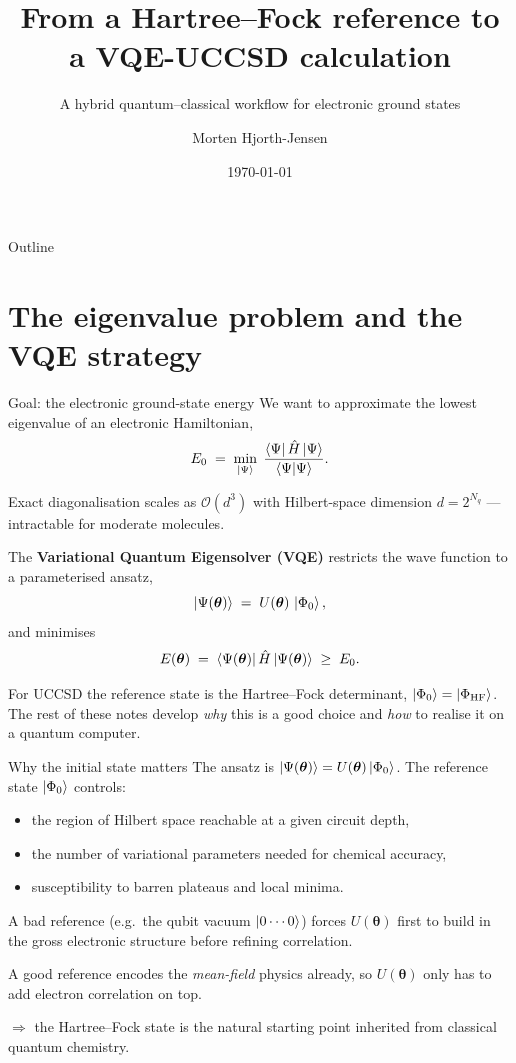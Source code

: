 \documentclass[10pt,aspectratio=169]{beamer}
\title[VQE-UCCSD from a Hartree--Fock reference]
{From a Hartree--Fock reference to a VQE-UCCSD calculation}
\subtitle{A hybrid quantum--classical workflow for electronic ground states}
\author{Morten Hjorth-Jensen}
\date{\today}
\begin{document}
\begin{frame}
\titlepage
\end{frame}

\begin{frame}{Outline}
\tableofcontents
\end{frame}

\section{The eigenvalue problem and the VQE strategy}

\begin{frame}{Goal: the electronic ground-state energy}
We want to approximate the lowest eigenvalue of an electronic Hamiltonian,
\[
E_0 \;=\; \min_{\ket{\Psi}}\;
\frac{\bra{\Psi}\hat H\ket{\Psi}}{\braket{\Psi|\Psi}}.
\]

Exact diagonalisation scales as $\mathcal{O}(d^3)$ with Hilbert-space dimension $d=2^{N_q}$ --- intractable for moderate molecules.

\medskip
The \textbf{Variational Quantum Eigensolver (VQE)} restricts the wave function to a parameterised ansatz,
\[
\ket{\Psi(\bm\theta)} \;=\; U(\bm\theta)\,\ket{\Phi_0},
\]
and minimises
\[
E(\bm\theta) \;=\; \bra{\Psi(\bm\theta)}\hat H\ket{\Psi(\bm\theta)} \;\geq\; E_0.
\]

For UCCSD the reference state is the Hartree--Fock determinant,
$\ket{\Phi_0}=\ket{\Phi_{\mathrm{HF}}}$. The rest of these notes
develop \emph{why} this is a good choice and \emph{how} to realise it on a quantum computer.
\end{frame}

\begin{frame}{Why the initial state matters}
The ansatz is $\ket{\Psi(\bm\theta)} = U(\bm\theta)\ket{\Phi_0}$. The reference state $\ket{\Phi_0}$ controls:
\begin{itemize}
  \item the region of Hilbert space reachable at a given circuit depth,
  \item the number of variational parameters needed for chemical accuracy,
  \item susceptibility to barren plateaus and local minima.
\end{itemize}

\medskip
A bad reference (e.g.\ the qubit vacuum $\ket{0\cdots 0}$) forces $U(\bm\theta)$ first to build in the gross electronic structure before refining correlation.

\medskip
A good reference encodes the \emph{mean-field} physics already, so $U(\bm\theta)$ only has to add electron correlation on top.

\medskip
$\Rightarrow$ the Hartree--Fock state is the natural starting point inherited from classical quantum chemistry.
\end{frame}
\end{document}

